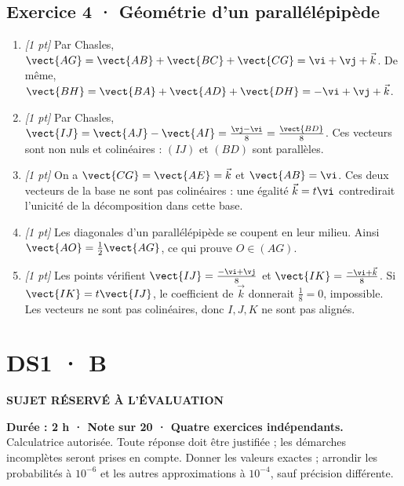 \subsection*{Exercice 4 · Géométrie d'un parallélépipède}\begin{enumerate}

\item \textit{[1 pt]} Par Chasles, $\vect{AG}=\vect{AB}+\vect{BC}+\vect{CG}=\vi +\vj +\vec k$. De même, $\vect{BH}=\vect{BA}+\vect{AD}+\vect{DH}=-\vi +\vj +\vec k$.

\item \textit{[1 pt]} Par Chasles, $\vect{IJ}=\vect{AJ}-\vect{AI}=\frac{\vj -\vi }{8}=\frac{\vect{BD}}{8}$. Ces vecteurs sont non nuls et colinéaires : $(IJ)$ et $(BD)$ sont parallèles.

\item \textit{[1 pt]} On a $\vect{CG}=\vect{AE}=\vec k$ et $\vect{AB}=\vi $. Ces deux vecteurs de la base ne sont pas colinéaires : une égalité $\vec k=t\vi $ contredirait l'unicité de la décomposition dans cette base.

\item \textit{[1 pt]} Les diagonales d'un parallélépipède se coupent en leur milieu. Ainsi $\vect{AO}=\frac12\vect{AG}$, ce qui prouve $O\in(AG)$.

\item \textit{[1 pt]} Les points vérifient $\vect{IJ}=\frac{-\vi +\vj }{8}$ et $\vect{IK}=\frac{-\vi +\vec k}{8}$. Si $\vect{IK}=t\vect{IJ}$, le coefficient de $\vec k$ donnerait $\frac{1}{8}=0$, impossible. Les vecteurs ne sont pas colinéaires, donc $I,J,K$ ne sont pas alignés.

\end{enumerate}

\fi

\fi

\ifprof

\clearpage{}\label{sujet:1-4}

\section*{DS1 · B}

{\sffamily\bfseries\color{amber}SUJET RÉSERVÉ À L'ÉVALUATION\par}

\textbf{Durée : 2 h · Note sur 20 · Quatre exercices indépendants.}\\Calculatrice autorisée. Toute réponse doit être justifiée ; les démarches incomplètes seront prises en compte. Donner les valeurs exactes ; arrondir les probabilités à $10^{-6}$ et les autres approximations à $10^{-4}$, sauf précision différente.

